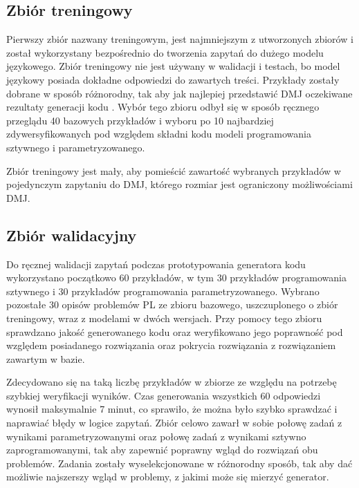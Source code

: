 \subsection{Zbiór treningowy}

Pierwszy zbiór nazwany treningowym, jest najmniejszym z utworzonych zbiorów i został wykorzystany bezpośrednio do tworzenia zapytań do dużego modelu językowego. Zbiór treningowy nie jest używany w walidacji i testach, bo model językowy posiada dokładne odpowiedzi do zawartych treści. Przykłady zostały dobrane w sposób różnorodny, tak aby jak najlepiej przedstawić DMJ oczekiwane rezultaty generacji kodu . Wybór tego zbioru odbył się w sposób ręcznego przeglądu 40 bazowych przykładów i wyboru po 10 najbardziej zdywersyfikowanych pod względem składni kodu  modeli programowania sztywnego i parametryzowanego.  %

Zbiór treningowy jest mały, aby pomieścić zawartość wybranych przykładów w pojedynczym zapytaniu do DMJ, którego rozmiar jest ograniczony możliwościami DMJ.

\subsection{Zbiór walidacyjny}

Do ręcznej walidacji zapytań podczas prototypowania generatora kodu   wykorzystano początkowo 60 przykładów, w tym 30 przykładów programowania sztywnego i 30 przykładów programowania parametryzowanego. Wybrano pozostałe 30 opisów problemów PL ze zbioru bazowego, uszczuplonego o zbiór treningowy, wraz z modelami  w dwóch wersjach. Przy pomocy tego zbioru sprawdzano jakość generowanego kodu   oraz weryfikowano jego poprawność pod względem posiadanego rozwiązania oraz pokrycia rozwiązania z rozwiązaniem zawartym w bazie.

Zdecydowano się na taką liczbę przykładów w zbiorze ze względu na potrzebę szybkiej weryfikacji wyników. Czas generowania wszystkich 60 odpowiedzi wynosił maksymalnie 7 minut, co sprawiło, że można było szybko sprawdzać i naprawiać błędy w logice zapytań. Zbiór celowo zawarł w sobie połowę zadań z wynikami parametryzowanymi oraz połowę zadań z wynikami sztywno zaprogramowanymi, tak aby zapewnić poprawny wgląd do rozwiązań obu problemów. Zadania zostały wyselekcjonowane w różnorodny sposób, tak aby dać możliwie najszerszy wgląd w problemy, z jakimi może się mierzyć generator. %

